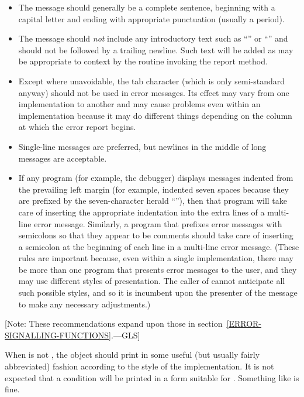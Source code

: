 \begin{itemize}
 \item
    The message should generally be a complete sentence, beginning with a
   capital letter and ending with appropriate punctuation (usually a period).

 \item
    The message should {\it not} include any introductory text such as ``''
   or ``'' and should not be followed by a trailing newline. Such
   text will be added as may be appropriate to context by the routine invoking
   the report method.

 \item
    Except where unavoidable, the tab character (which is only semi-standard anyway)
    should not be used in
   error messages. Its effect may vary from one implementation to another and may
   cause problems even within an implementation because it may do different
   things depending on the column at which the error report begins.

 \item
    Single-line messages are preferred, but newlines in the middle of long
   messages are acceptable.

 \item
   If any program (for example, the debugger) displays messages indented from the
   prevailing left margin (for example, indented seven spaces because they
   are prefixed by the seven-character herald ``''), then that program
   will take care of inserting the appropriate indentation into the extra
   lines of a multi-line error message. Similarly, a program that prefixes
   error messages with semicolons so that they appear to be comments should
   take care of inserting a semicolon at the beginning of each line in a
   multi-line error message. (These rules are important because, even within
   a single implementation, there may be more than one program that presents
   error messages to the user, and they may use different styles of
   presentation. The caller of  cannot anticipate all such possible
   styles, and so it is incumbent upon the presenter of the message to make
   any necessary adjustments.)
\end{itemize}
[Note: These recommendations expand upon those in section~\ref{ERROR-SIGNALLING-FUNCTIONS}.---GLS]

When  is not , the object should print in some useful (but
usually fairly abbreviated) fashion according to the style of the
implementation. It is not expected that a condition will be printed in a form
suitable for . Something like 
is fine.


